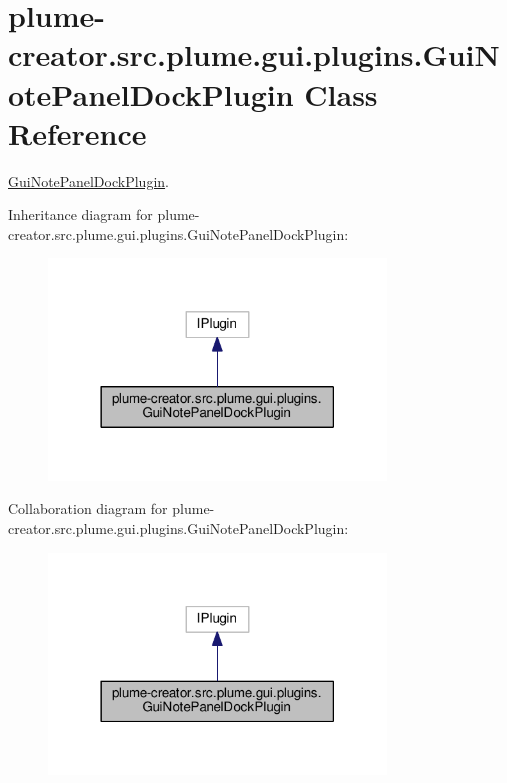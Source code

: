 \hypertarget{classplume-creator_1_1src_1_1plume_1_1gui_1_1plugins_1_1_gui_note_panel_dock_plugin}{}\section{plume-\/creator.src.\+plume.\+gui.\+plugins.\+Gui\+Note\+Panel\+Dock\+Plugin Class Reference}
\label{classplume-creator_1_1src_1_1plume_1_1gui_1_1plugins_1_1_gui_note_panel_dock_plugin}


\hyperlink{classplume-creator_1_1src_1_1plume_1_1gui_1_1plugins_1_1_gui_note_panel_dock_plugin}{Gui\+Note\+Panel\+Dock\+Plugin}.  




Inheritance diagram for plume-\/creator.src.\+plume.\+gui.\+plugins.\+Gui\+Note\+Panel\+Dock\+Plugin\+:\nopagebreak
\begin{figure}[H]
\begin{center}
\leavevmode
\includegraphics[width=254pt]{classplume-creator_1_1src_1_1plume_1_1gui_1_1plugins_1_1_gui_note_panel_dock_plugin__inherit__graph}
\end{center}
\end{figure}


Collaboration diagram for plume-\/creator.src.\+plume.\+gui.\+plugins.\+Gui\+Note\+Panel\+Dock\+Plugin\+:\nopagebreak
\begin{figure}[H]
\begin{center}
\leavevmode
\includegraphics[width=254pt]{classplume-creator_1_1src_1_1plume_1_1gui_1_1plugins_1_1_gui_note_panel_dock_plugin__coll__graph}
\end{center}
\end{figure}
